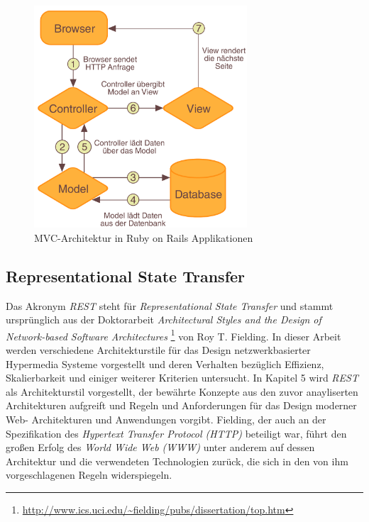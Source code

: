 \begin{figure}[h]
  \begin{center}
    \includegraphics[width=300px]{bilder/mvc}
    \caption{MVC-Architektur in Ruby on Rails Applikationen}
  \end{center}
\end{figure}

\subsection{Representational State Transfer}
\label{rest}

Das Akronym \textit{REST} steht für \textit{Representational State
  Transfer} und stammt ursprünglich aus der Doktorarbeit
\textit{Architectural Styles and the Design of Network-based Software
  Architectures} \cite{Fielding2000}
\footnote{\url{http://www.ics.uci.edu/~fielding/pubs/dissertation/top.htm}}
von Roy T. Fielding. In dieser Arbeit werden verschiedene
Architekturstile für das Design netzwerkbasierter Hypermedia Systeme
vorgestellt und deren Verhalten bezüglich Effizienz, Skalierbarkeit
und einiger weiterer Kriterien untersucht. In Kapitel 5 wird
\textit{REST} als Architekturstil vorgestellt, der bewährte Konzepte
aus den zuvor anayliserten Architekturen aufgreift und Regeln und
Anforderungen für das Design moderner Web- Architekturen und
Anwendungen vorgibt. Fielding, der auch an der Spezifikation des
\textit{Hypertext Transfer Protocol (HTTP)}
 beteiligt war, führt
den großen Erfolg des \textit{World Wide Web (WWW)}
 unter anderem auf dessen
Architektur und die verwendeten Technologien zurück, die sich in den
von ihm vorgeschlagenen Regeln widerspiegeln. 

